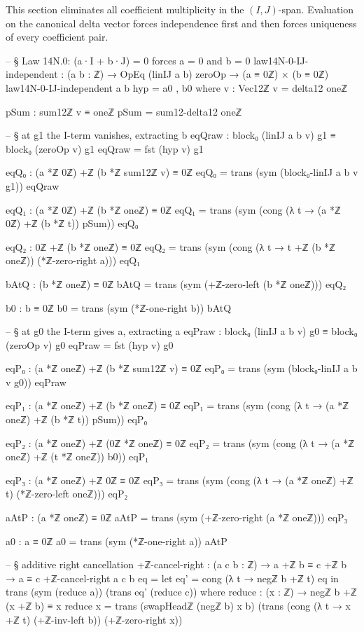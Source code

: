 \documentclass[11pt,a4paper]{book}
\begin{document}
This section eliminates all coefficient multiplicity in the $(I,J)$-span.
Evaluation on the canonical delta vector forces independence first and then
forces uniqueness of every coefficient pair.

\begin{code}
-- § Law 14N.0: (a·I + b·J) = 0 forces a = 0 and b = 0
law14N-0-IJ-independent : (a b : ℤ) → OpEq (linIJ a b) zeroOp → (a ≡ 0ℤ) × (b ≡ 0ℤ)
law14N-0-IJ-independent a b hyp = a0 , b0
  where
    v : Vec12ℤ
    v = delta12 oneℤ

    pSum : sum12ℤ v ≡ oneℤ
    pSum = sum12-delta12 oneℤ

    -- § at g1 the I-term vanishes, extracting b
    eqQraw : block₀ (linIJ a b v) g1 ≡ block₀ (zeroOp v) g1
    eqQraw = fst (hyp v) g1

    eqQ₀ : (a *ℤ 0ℤ) +ℤ (b *ℤ sum12ℤ v) ≡ 0ℤ
    eqQ₀ = trans (sym (block₀-linIJ a b v g1)) eqQraw

    eqQ₁ : (a *ℤ 0ℤ) +ℤ (b *ℤ oneℤ) ≡ 0ℤ
    eqQ₁ = trans (sym (cong (λ t → (a *ℤ 0ℤ) +ℤ (b *ℤ t)) pSum)) eqQ₀

    eqQ₂ : 0ℤ +ℤ (b *ℤ oneℤ) ≡ 0ℤ
    eqQ₂ =
      trans
        (sym (cong (λ t → t +ℤ (b *ℤ oneℤ)) (*ℤ-zero-right a)))
        eqQ₁

    bAtQ : (b *ℤ oneℤ) ≡ 0ℤ
    bAtQ = trans (sym (+ℤ-zero-left (b *ℤ oneℤ))) eqQ₂

    b0 : b ≡ 0ℤ
    b0 = trans (sym (*ℤ-one-right b)) bAtQ

    -- § at g0 the I-term gives a, extracting a
    eqPraw : block₀ (linIJ a b v) g0 ≡ block₀ (zeroOp v) g0
    eqPraw = fst (hyp v) g0

    eqP₀ : (a *ℤ oneℤ) +ℤ (b *ℤ sum12ℤ v) ≡ 0ℤ
    eqP₀ = trans (sym (block₀-linIJ a b v g0)) eqPraw

    eqP₁ : (a *ℤ oneℤ) +ℤ (b *ℤ oneℤ) ≡ 0ℤ
    eqP₁ = trans (sym (cong (λ t → (a *ℤ oneℤ) +ℤ (b *ℤ t)) pSum)) eqP₀

    eqP₂ : (a *ℤ oneℤ) +ℤ (0ℤ *ℤ oneℤ) ≡ 0ℤ
    eqP₂ =
      trans
        (sym (cong (λ t → (a *ℤ oneℤ) +ℤ (t *ℤ oneℤ)) b0))
        eqP₁

    eqP₃ : (a *ℤ oneℤ) +ℤ 0ℤ ≡ 0ℤ
    eqP₃ =
      trans
        (sym (cong (λ t → (a *ℤ oneℤ) +ℤ t) (*ℤ-zero-left oneℤ)))
        eqP₂

    aAtP : (a *ℤ oneℤ) ≡ 0ℤ
    aAtP = trans (sym (+ℤ-zero-right (a *ℤ oneℤ))) eqP₃

    a0 : a ≡ 0ℤ
    a0 = trans (sym (*ℤ-one-right a)) aAtP

-- § additive right cancellation
+ℤ-cancel-right : (a c b : ℤ) → a +ℤ b ≡ c +ℤ b → a ≡ c
+ℤ-cancel-right a c b eq =
  let eq' = cong (λ t → negℤ b +ℤ t) eq in
  trans
    (sym (reduce a))
    (trans eq' (reduce c))
  where
    reduce : (x : ℤ) → negℤ b +ℤ (x +ℤ b) ≡ x
    reduce x =
      trans
        (swapHeadℤ (negℤ b) x b)
        (trans
          (cong (λ t → x +ℤ t) (+ℤ-inv-left b))
          (+ℤ-zero-right x))
\end{code}
\end{document}
